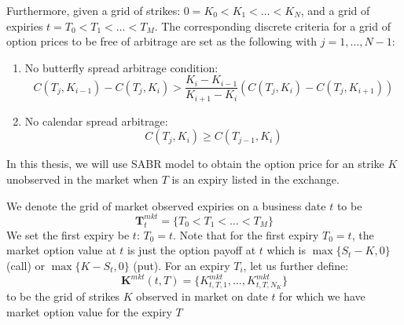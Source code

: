 \documentclass[letterpaper,12pt,titlepage,oneside,final]{book}
\numberwithin{equation}{section}
\theoremstyle{definition}
\begin{document}
\begin{enumerate}
	
\end{enumerate}

Furthermore,  given a  grid of strikes: $0=K_0<K_1<\dots<K_{N}$, and a grid of expiries $t=T_0 < T_1 < \dots< T_{M} $.   The corresponding discrete criteria \cite{carr2005note} for a grid of  option prices to be free of arbitrage are set as the following with $j=1,\dots,N-1$: 
\begin{enumerate}
	\item  No butterfly spread arbitrage condition:
	\begin{equation}
	C(T_{j},K_{i-1})-C(T_{j},K_{i}) > \frac{K_i-K_{i-1}}{K_{i+1}-K_{i}}
	\left( C(T_{j},K_{i})-C(T_{j},K_{i+1})  \right)
	\label{eq:DiscreteCond1}
	\end{equation}
	\item  No calendar spread arbitrage:
	\begin{equation}
	C(T_{j},K_{i})\geq C(T_{j-1},K_{i})
	\label{eq:DiscreteCond2}
	\end{equation}
	
\end{enumerate}



In this thesis, we will use SABR model to obtain the option price for an strike $K$ unobserved in the market when $T$ is an expiry listed in the exchange.


We denote the grid of market observed expiries on a business date $t$ to be \[
\mathbf{T}^{mkt}_t=\{ T_{0}<
T_1 < \dots< T_{M}
\}
\]
We set the first expiry be $t$: $T_{0}=t$. Note that for the first expiry $T_{0}=t$, the market option value at $t$ is just the option payoff at $t$ which is $\max\{S_t-K,0\}$ (call) or  $\max\{K-S_t,0\}$ (put).  For an  expiry $T_i$, let us further define:
\[\mathbf{K}^{mkt}(t,T)=
\{
K^{mkt}_{t,T,1},\dots,K^{mkt}_{t,T,N_K}
\}
\] to be the grid of strikes $K$ observed in market on date $t$  for which we have market option value for the expiry $T$
\end{document}
